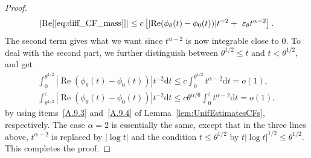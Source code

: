 \documentclass[AHL,Unicode,longabstracts]{cedram}
\DeclareMathOperator{\re}{Re}
\newcommand{\ga}{\alpha}
\newcommand{\gep}{\varepsilon}
\newcommand{\gt}{\theta}
\newcommand{\dd}{\mathrm{d}}
\begin{document}
\begin{proof}
\begin{equation}
\mathopen{|}\re[\eqref{eq:diff_CF_mass}]| \le c
\left[
\mathopen{|} \re(\phi_\gt(t) - \phi_0(t))| t^{-2} +\
\gep_\gt t^{\ga - 2}\right].
\end{equation} The second term gives what we want since $t^{\ga-2}$ is now integrable close to $0$. To deal with the second part, we further distinguish between $\gt^{1/2} \le t$ and $t < \gt^{1/2}$, and get
\begin{gather}
\int_0^{\theta^{1/2}} |{\re(\phi_\gt(t) - \phi_0(t))}| t^{-2} \dd t \le c \int_0^{\theta^{1/2}} t^{\ga-2} \dd t= o(1),
\\
\int_{\theta^{1/2}}^\gep |{\re(\phi_\gt(t) - \phi_0(t))}| t^{-2} \dd t \le c \gt^{\ga/6} \int_0^{\gep} t^{\ga-2} \dd t = o(1),
\end{gather}
by using items~\eqref{A.9.3} and~\eqref{A.9.4} of Lemma~\ref{lem:UnifEstimatesCFs}, respectively. The case $\ga = 2$ is essentially the same, except that in the three lines above, $t^{\ga-2}$ is replaced by $|\log t|$ and the condition $t\le \gt^{1/2}$ by $t|\log t|^{1/2}\le \gt^{1/2}$. This completes the proof.
\end{proof}


\end{document}
